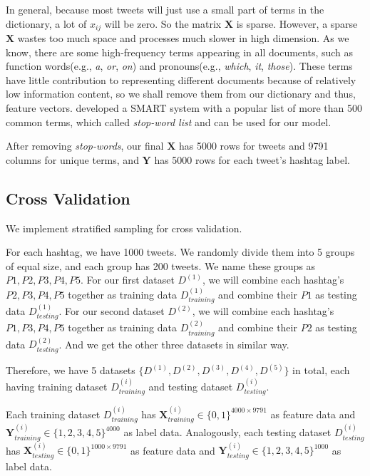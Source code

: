 \documentclass[letterpaper,11pt,twocolumn]{article}
\def\bfY{\mathbf Y}
\def\bfX{\mathbf X}
\begin{document}
In general, because most tweets will just use a small part of terms in the dictionary, a lot of $x_{ij}$ will be zero. So the matrix $\bfX$ is sparse. However, a sparse $\bfX$ wastes too much space and processes much slower in high dimension. As we know, there are some high-frequency terms appearing in all documents, such as function words(e.g., \emph{a}, \emph{or}, \emph{on}) and pronouns(e.g., \emph{which}, \emph{it}, \emph{those}). These terms have little contribution to representing different documents because of relatively low information content, so we shall remove them from our dictionary and thus, feature vectors. \cite{salton1971smart} developed a SMART system with a popular list of more than 500 common terms, which called \emph{stop-word list} and can be used for our model.

After removing \emph{stop-words}, our final $\bfX$ has 5000 rows for tweets and 9791 columns for unique terms, and $\bfY$ has 5000 rows for each tweet's hashtag label.

\subsection{Cross Validation}
We implement stratified sampling for cross validation.

For each hashtag, we have 1000 tweets. We randomly divide them into 5 groups of equal size, and each group has 200 tweets. We name these groups as $P1, P2, P3, P4, P5$. For our first dataset $D^{(1)}$, we will combine each hashtag's $P2, P3, P4, P5$ together as training data $D_{training}^{(1)}$ and combine their $P1$ as testing data $D_{testing}^{(1)}$. For our second dataset $D^{(2)}$, we will combine each hashtag's $P1, P3, P4, P5$ together as training data $D_{training}^{(2)}$ and combine their $P2$ as testing data $D_{testing}^{(2)}$. And we get the other three datasets in similar way.

Therefore, we have 5 datasets $\{D^{(1)}, D^{(2)}, D^{(3)}, D^{(4)}, D^{(5)}\}$ in total, each having training dataset $D_{training}^{(i)}$ and testing dataset $D_{testing}^{(i)}$.

Each training dataset $D_{training}^{(i)}$ has $\bfX_{training}^{(i)} \in \{0, 1\}^{4000 \times 9791}$ as feature data and $\bfY_{training}^{(i)} \in \{1, 2, 3, 4, 5\}^{4000}$ as label data. Analogously, each testing dataset $D_{testing}^{(i)}$ has $\bfX_{testing}^{(i)} \in \{0, 1\}^{1000 \times 9791}$ as feature data and $\bfY_{testing}^{(i)} \in \{1, 2, 3, 4, 5\}^{1000}$ as label data.
\end{document}
